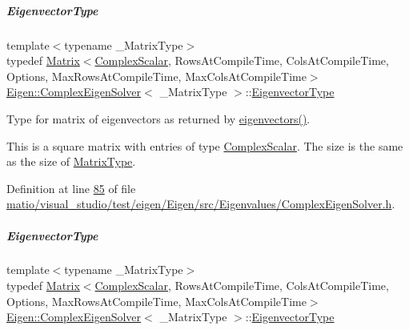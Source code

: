 \mbox{\label{group___eigenvalues___module_a67cd4d20590abfd86b2639c4c8ea3dd6}} 
\subparagraph{\texorpdfstring{Eigenvector\+Type}{EigenvectorType}\hspace{0.1cm}{\footnotesize\ttfamily [1/2]}}
{\footnotesize\ttfamily template$<$typename \+\_\+\+Matrix\+Type$>$ \\
typedef \hyperlink{group___core___module_class_eigen_1_1_matrix}{Matrix}$<$\hyperlink{group___eigenvalues___module_a3604c99a69fac3bee42c88cb2b589143}{Complex\+Scalar}, Rows\+At\+Compile\+Time, Cols\+At\+Compile\+Time, Options, Max\+Rows\+At\+Compile\+Time, Max\+Cols\+At\+Compile\+Time$>$ \hyperlink{group___eigenvalues___module_class_eigen_1_1_complex_eigen_solver}{Eigen\+::\+Complex\+Eigen\+Solver}$<$ \+\_\+\+Matrix\+Type $>$\+::\hyperlink{group___eigenvalues___module_a67cd4d20590abfd86b2639c4c8ea3dd6}{Eigenvector\+Type}}



Type for matrix of eigenvectors as returned by \hyperlink{group___eigenvalues___module_a3aa5e27800349990778da8fa532c1270}{eigenvectors()}. 

This is a square matrix with entries of type \hyperlink{group___eigenvalues___module_a3604c99a69fac3bee42c88cb2b589143}{Complex\+Scalar}. The size is the same as the size of \hyperlink{group___eigenvalues___module_ad61f6278843a601096276c9a72c0252f}{Matrix\+Type}. 

Definition at line \hyperlink{matio_2visual__studio_2test_2eigen_2_eigen_2src_2_eigenvalues_2_complex_eigen_solver_8h_source_l00085}{85} of file \hyperlink{matio_2visual__studio_2test_2eigen_2_eigen_2src_2_eigenvalues_2_complex_eigen_solver_8h_source}{matio/visual\+\_\+studio/test/eigen/\+Eigen/src/\+Eigenvalues/\+Complex\+Eigen\+Solver.\+h}.

\mbox{\label{group___eigenvalues___module_a67cd4d20590abfd86b2639c4c8ea3dd6}} 
\subparagraph{\texorpdfstring{Eigenvector\+Type}{EigenvectorType}\hspace{0.1cm}{\footnotesize\ttfamily [2/2]}}
{\footnotesize\ttfamily template$<$typename \+\_\+\+Matrix\+Type$>$ \\
typedef \hyperlink{group___core___module_class_eigen_1_1_matrix}{Matrix}$<$\hyperlink{group___eigenvalues___module_a3604c99a69fac3bee42c88cb2b589143}{Complex\+Scalar}, Rows\+At\+Compile\+Time, Cols\+At\+Compile\+Time, Options, Max\+Rows\+At\+Compile\+Time, Max\+Cols\+At\+Compile\+Time$>$ \hyperlink{group___eigenvalues___module_class_eigen_1_1_complex_eigen_solver}{Eigen\+::\+Complex\+Eigen\+Solver}$<$ \+\_\+\+Matrix\+Type $>$\+::\hyperlink{group___eigenvalues___module_a67cd4d20590abfd86b2639c4c8ea3dd6}{Eigenvector\+Type}}



